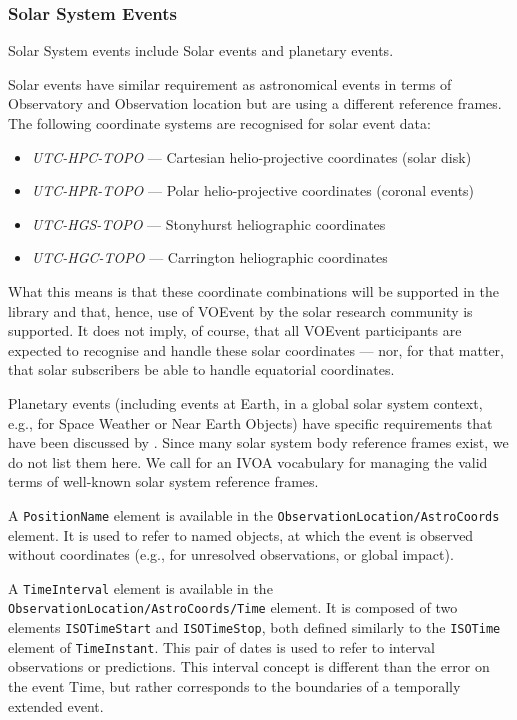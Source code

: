 \documentclass[11pt,a4paper]{ivoa}
\begin{document}
\subsubsection{Solar System Events}
\label{sec:3.4.4}
Solar System events include Solar events and planetary events. 

Solar events have similar requirement as astronomical events in terms of Observatory and Observation location but are using a different reference frames. The following coordinate systems are recognised for solar event data: 
\begin{itemize}
\item \emph{UTC-HPC-TOPO} --- Cartesian helio-projective coordinates (solar disk)
\item \emph{UTC-HPR-TOPO} --- Polar helio-projective coordinates (coronal events)
\item \emph{UTC-HGS-TOPO} --- Stonyhurst heliographic coordinates
\item \emph{UTC-HGC-TOPO} --- Carrington heliographic coordinates
\end{itemize}

What this means is that these coordinate combinations will be supported in the library and that, hence, use of VOEvent by the solar research community is supported. It does not imply, of course, that all VOEvent participants are expected to recognise and handle these solar coordinates --- nor, for that matter, that solar subscribers be able to handle equatorial coordinates. 

Planetary events (including events at Earth, in a global solar system context, e.g., for Space Weather or Near Earth Objects) have specific requirements that have been discussed by \citet{2018arXiv181112680C}. Since many solar system body reference frames exist, we do not list them here. We call for an IVOA vocabulary for managing the valid terms of well-known solar system reference frames.

A {\tt PositionName} element is available in the {\tt ObservationLocation/AstroCoords} element. It is used to refer to named objects, at which the event is observed without coordinates (e.g., for unresolved observations, or global impact).  

A {\tt TimeInterval} element is available in the {\tt ObservationLocation/AstroCoords/Time} element. It is composed of two elements {\tt ISOTimeStart} and {\tt ISOTimeStop}, both defined similarly to the {\tt ISOTime} element of {\tt TimeInstant}. This pair of dates is used to refer to interval observations or predictions. This interval concept is different than the error on the event Time, but rather corresponds to the boundaries of a temporally extended event. 
\end{document}
